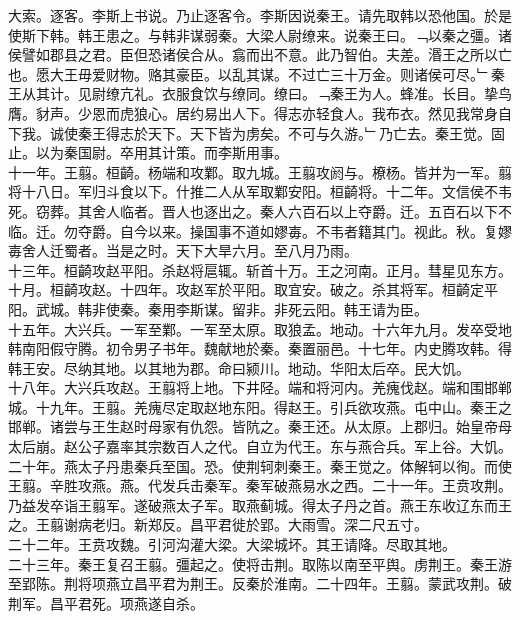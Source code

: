 \documentclass{zhvt-classic}
\begin{document}
\hspace*{2em}大索。逐客。李斯上书说。乃止逐客令。李斯因说秦王。请先取韩以恐他国。於是使斯下韩。韩王患之。与韩非谋弱秦。大梁人尉缭来。说秦王曰。﹁以秦之彊。诸侯譬如郡县之君。臣但恐诸侯合从。翕而出不意。此乃智伯。夫差。湣王之所以亡也。愿大王毋爱财物。赂其豪臣。以乱其谋。不过亡三十万金。则诸侯可尽。﹂秦王从其计。见尉缭亢礼。衣服食饮与缭同。缭曰。﹁秦王为人。蜂准。长目。挚鸟膺。豺声。少恩而虎狼心。居约易出人下。得志亦轻食人。我布衣。然见我常身自下我。诚使秦王得志於天下。天下皆为虏矣。不可与久游。﹂乃亡去。秦王觉。固止。以为秦国尉。卒用其计策。而李斯用事。\\
\hspace*{2em}十一年。王翦。桓齮。杨端和攻鄴。取九城。王翦攻阏与。橑杨。皆并为一军。翦将十八日。军归斗食以下。什推二人从军取鄴安阳。桓齮将。十二年。文信侯不韦死。窃葬。其舍人临者。晋人也逐出之。秦人六百石以上夺爵。迁。五百石以下不临。迁。勿夺爵。自今以来。操国事不道如嫪毐。不韦者籍其门。视此。秋。复嫪毐舍人迁蜀者。当是之时。天下大旱六月。至八月乃雨。\\
\hspace*{2em}十三年。桓齮攻赵平阳。杀赵将扈辄。斩首十万。王之河南。正月。彗星见东方。十月。桓齮攻赵。十四年。攻赵军於平阳。取宜安。破之。杀其将军。桓齮定平阳。武城。韩非使秦。秦用李斯谋。留非。非死云阳。韩王请为臣。\\
\hspace*{2em}十五年。大兴兵。一军至鄴。一军至太原。取狼孟。地动。十六年九月。发卒受地韩南阳假守腾。初令男子书年。魏献地於秦。秦置丽邑。十七年。内史腾攻韩。得韩王安。尽纳其地。以其地为郡。命曰颍川。地动。华阳太后卒。民大饥。\\
\hspace*{2em}十八年。大兴兵攻赵。王翦将上地。下井陉。端和将河内。羌瘣伐赵。端和围邯郸城。十九年。王翦。羌瘣尽定取赵地东阳。得赵王。引兵欲攻燕。屯中山。秦王之邯郸。诸尝与王生赵时母家有仇怨。皆阬之。秦王还。从太原。上郡归。始皇帝母太后崩。赵公子嘉率其宗数百人之代。自立为代王。东与燕合兵。军上谷。大饥。\\
\hspace*{2em}二十年。燕太子丹患秦兵至国。恐。使荆轲刺秦王。秦王觉之。体解轲以徇。而使王翦。辛胜攻燕。燕。代发兵击秦军。秦军破燕易水之西。二十一年。王贲攻荆。乃益发卒诣王翦军。遂破燕太子军。取燕蓟城。得太子丹之首。燕王东收辽东而王之。王翦谢病老归。新郑反。昌平君徙於郢。大雨雪。深二尺五寸。\\
\hspace*{2em}二十二年。王贲攻魏。引河沟灌大梁。大梁城坏。其王请降。尽取其地。\\
\hspace*{2em}二十三年。秦王复召王翦。彊起之。使将击荆。取陈以南至平舆。虏荆王。秦王游至郢陈。荆将项燕立昌平君为荆王。反秦於淮南。二十四年。王翦。蒙武攻荆。破荆军。昌平君死。项燕遂自杀。\\
\end{document}
